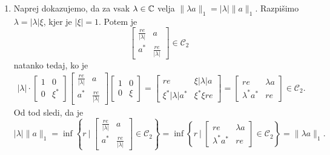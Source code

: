\begin{dokaz}
\begin{enumerate}
        Ko ti enačbi seštejemo, dobimo $a = 0$.
        \item Naprej dokazujemo, da za vsak $\lambda \in \mathbb C$ velja $\| \lambda a\|_1 = |\lambda| \| a \|_1$.
        Razpišimo $\lambda = |\lambda| \xi$, kjer je $| \xi| = 1$. Potem je 
        $$\begin{bmatrix}
            \frac{re}{|\lambda|} & a\\
            a^* & \frac{re}{|\lambda|}
        \end{bmatrix} \in \mathcal{C}_2$$
        natanko tedaj, ko je 
        \begin{align*}
            |\lambda| \cdot 
            \begin{bmatrix}
                1 & 0\\
                0 & \xi^*
            \end{bmatrix}  
            \begin{bmatrix}
                \frac{re}{|\lambda|} & a\\
                a^* & \frac{re}{|\lambda|}
            \end{bmatrix}
            \begin{bmatrix}
                1 & 0\\
                0 & \xi
            \end{bmatrix} 
            = \begin{bmatrix}
                re & \xi |\lambda| a\\
                \xi^* |\lambda| a^* &  \xi^* \xi re
            \end{bmatrix} = \begin{bmatrix}
                re & \lambda a\\
                \lambda^* a^* &  re
            \end{bmatrix} \in \mathcal{C}_2.
        \end{align*}
        Od tod sledi, da je 
        $$|\lambda| \| a\|_1 = \inf \left\lbrace r\ |\ \begin{bmatrix}
            \frac{re}{|\lambda|} & a\\
            a^* & \frac{re}{|\lambda|}
        \end{bmatrix} \in \mathcal{C}_2 \right\rbrace= \inf  \left\lbrace r\ |\ \begin{bmatrix}
            re & \lambda a\\
            \lambda^* a^* &  re
        \end{bmatrix} \in \mathcal{C}_2 \right\rbrace = \|\lambda a\|_1.$$

\end{enumerate}
\end{dokaz}
